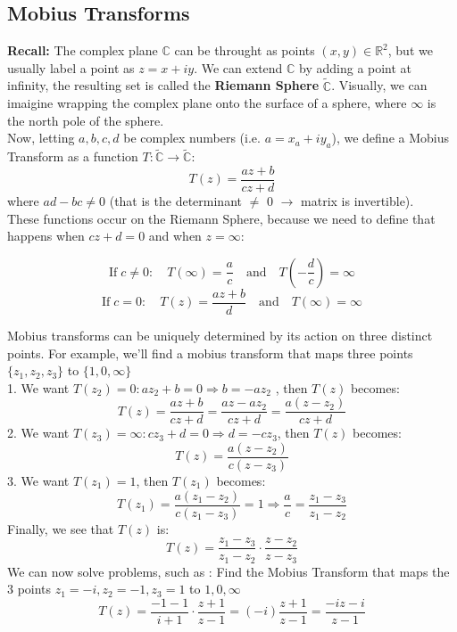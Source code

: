 \documentclass[a4paper, 10pt ]{article} %
\theoremstyle{definition}
\theoremstyle{plain}
\begin{document}
\subsection{Mobius Transforms}
\textbf{Recall:} The complex plane $\mathbb{C}$ can be throught as points $(x,y) \in \mathbb{R}^2$, but we usually label a point as $z = x+iy$.
We can extend $\mathbb{C}$ by adding a point at infinity, the resulting set is called the \textbf{Riemann Sphere} $\tilde{\mathbb{C}}$.
Visually, we can imaigine wrapping the complex plane onto the surface of a sphere, where $\infty$ is the north pole of the sphere. \\[2ex]
\noindent Now, letting $a,b,c,d$ be complex numbers (i.e. $ a = x_a + iy_a$), we define a Mobius Transform as a function $T:\tilde{\mathbb{C}} \to \tilde{\mathbb{C}}:$
$$T(z) = \frac{az + b}{cz +d}$$
where $ad -bc \neq 0$ (that is the determinant $\neq$ 0 $\rightarrow$ matrix is invertible). \\
These functions occur on the Riemann Sphere, because we need to define that happens when $cz + d = 0$ and when $z = \infty$:

$$\text{If} \;c \neq 0: \quad T(\infty) = \frac{a}{c} \quad \text{and} \quad T\left(-\frac{d}{c}\right) = \infty$$
$$\text{If} \;c = 0: \quad T(z) = \frac{az + b}{d}\quad \text{and} \quad T(\infty) = \infty$$

\noindent Mobius transforms can be  uniquely determined by its action on three distinct points. For example, we'll find a mobius transform that maps three points $\{z_1, z_2, z_3\}$ to $\{1,0,\infty\}$ \\[2ex]
1. We want $T(z_2) = 0 : az_2 + b = 0 \Rightarrow b= -az_2$ , then $T(z)$ becomes:
$$T(z) = \frac{az + b}{cz + d} = \frac{az -az_2}{cz+d} = \frac{a(z-z_2)}{cz + d}$$
2. We want $T(z_3) = \infty : cz_3 + d = 0 \Rightarrow d = -cz_3$, then $T(z)$ becomes:
$$T(z) = \frac{a(z - z_2)}{c(z - z_3)}$$
3. We want $T(z_1) = 1$, then $T(z_1)$ becomes:
$$T(z_1) = \frac{a(z_1 - z_2)}{c(z_1 - z_3)} = 1 \Rightarrow \frac{a}{c} = \frac{z_1 - z_3}{z_1 - z_2}$$
Finally, we see that $T(z)$ is:
$$T(z) = \frac{z_1 - z_3}{z_1 - z_2}\cdot \frac{z - z_2}{z - z_3} $$
We can now solve problems, such as : Find the Mobius Transform that maps the 3 points $z_1 = -i, z_2 = -1, z_3 = 1$ to $1,0,\infty$
$$T(z) = \frac{-1 -1}{i + 1} \cdot \frac{z + 1}{z-1} = (-i)\frac{z+1}{z-1} = \frac{-iz -i}{z-1}$$

\pagebreak
\end{document}
